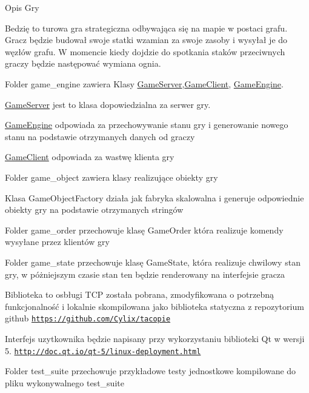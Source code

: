 
\begin{DoxyItemize}
\item Opis Gry
\end{DoxyItemize}

Bedzię to turowa gra strategiczna odbywająca się na mapie w postaci grafu. Gracz będzie budował swoje statki wzamian za swoje zasoby i wysyłał je do węzłów grafu. W momencie kiedy dojdzie do spotkania staków przeciwnych graczy będzie następować wymiana ognia.


\begin{DoxyItemize}
\item Folder game\+\_\+engine zawiera Klasy \hyperlink{classGameServer}{Game\+Server},\hyperlink{classGameClient}{Game\+Client}, \hyperlink{classGameEngine}{Game\+Engine}.
\end{DoxyItemize}

\hyperlink{classGameServer}{Game\+Server} jest to klasa dopowiedzialna za serwer gry.

\hyperlink{classGameEngine}{Game\+Engine} odpowiada za przechowywanie stanu gry i generowanie nowego stanu na podstawie otrzymanych danych od graczy

\hyperlink{classGameClient}{Game\+Client} odpowiada za wastwę klienta gry


\begin{DoxyItemize}
\item Folder game\+\_\+object zawiera klasy realizujące obiekty gry
\end{DoxyItemize}

Klasa Game\+Object\+Factory działa jak fabryka skalowalna i generuje odpowiednie obiekty gry na podstawie otrzymanych stringów
\begin{DoxyItemize}
\item Folder game\+\_\+order przechowuje klasę Game\+Order która realizuje komendy wysyłane przez klientów gry
\item Folder game\+\_\+state przechowuje klasę Game\+State, która realizuje chwilowy stan gry, w póżniejszym czasie stan ten będzie renderowany na interfejsie gracza
\item Biblioteka to osbługi T\+CP została pobrana, zmodyfikowana o potrzebną funkcjonalność i lokalnie skompilowana jako biblioteka statyczna z repozytorium github \href{https://github.com/Cylix/tacopie}{\tt https\+://github.\+com/\+Cylix/tacopie}
\item Interfejs uzytkownika będzie napisany przy wykorzystaniu biblioteki Qt w wersji 5. \href{http://doc.qt.io/qt-5/linux-deployment.html}{\tt http\+://doc.\+qt.\+io/qt-\/5/linux-\/deployment.\+html}
\item Folder test\+\_\+suite przechowuje przykładowe testy jednostkowe kompilowane do pliku wykonywalnego test\+\_\+suite 
\end{DoxyItemize}